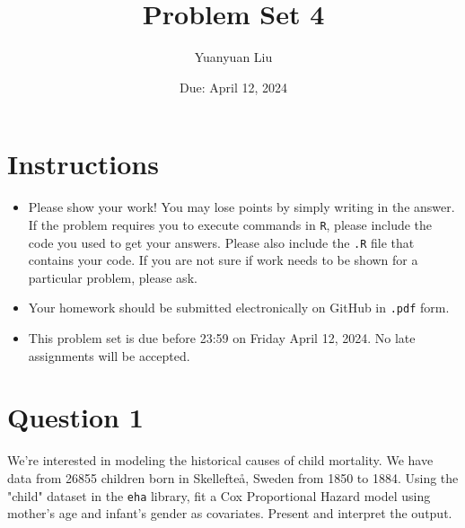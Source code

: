 \documentclass[12pt,letterpaper]{article}
\title{Problem Set 4}
\date{Due: April 12, 2024}
\author{Yuanyuan Liu}
\begin{document}
	\maketitle
	\section*{Instructions}
	\begin{itemize}
	\item Please show your work! You may lose points by simply writing in the answer. If the problem requires you to execute commands in \texttt{R}, please include the code you used to get your answers. Please also include the \texttt{.R} file that contains your code. If you are not sure if work needs to be shown for a particular problem, please ask.
	\item Your homework should be submitted electronically on GitHub in \texttt{.pdf} form.
	\item This problem set is due before 23:59 on Friday April 12, 2024. No late assignments will be accepted.

	\end{itemize}

	\vspace{.25cm}
\section*{Question 1}
\vspace{.25cm}
\noindent We're interested in modeling the historical causes of child mortality. We have data from 26855 children born in Skellefteå, Sweden from 1850 to 1884. Using the "child" dataset in the \texttt{eha} library, fit a Cox Proportional Hazard model using mother's age and infant's gender as covariates. Present and interpret the output.

\end{document}

